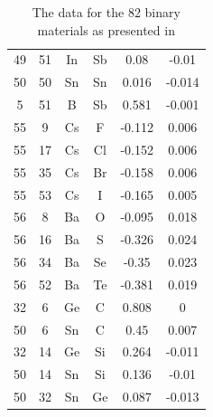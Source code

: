 \documentclass[11pt,oneside,czech,american]{book} %
\theoremstyle{definition} %
\theoremstyle{definition}
\begin{document}
\begin{table}
\begin{minipage}{0.5\textwidth}
\begin{tabular}{cccccc}
			49 &    51 & In  & Sb  &  0.08  & -0.01  \\
			50 &    50 & Sn  & Sn  &  0.016 & -0.014 \\
			5 &    51 & B   & Sb  &  0.581 & -0.001 \\
			55 &     9 & Cs  & F   & -0.112 &  0.006 \\
			55 &    17 & Cs  & Cl  & -0.152 &  0.006 \\
			55 &    35 & Cs  & Br  & -0.158 &  0.006 \\
			55 &    53 & Cs  & I   & -0.165 &  0.005 \\
			56 &     8 & Ba  & O   & -0.095 &  0.018 \\
			56 &    16 & Ba  & S   & -0.326 &  0.024 \\
			56 &    34 & Ba  & Se  & -0.35  &  0.023 \\
			56 &    52 & Ba  & Te  & -0.381 &  0.019 \\
			32 &     6 & Ge  & C   &  0.808 &  0     \\
			50 &     6 & Sn  & C   &  0.45  &  0.007 \\
			32 &    14 & Ge  & Si  &  0.264 & -0.011 \\
			50 &    14 & Sn  & Si  &  0.136 & -0.01  \\
			50 &    32 & Sn  & Ge  &  0.087 & -0.013 \\
			\bottomrule
		\end{tabular}
		
	\end{minipage}
\caption{The data for the 82 binary materials as presented in \parencite{ghiringhelli15_supplementary}}
\end{table}
\end{document}
